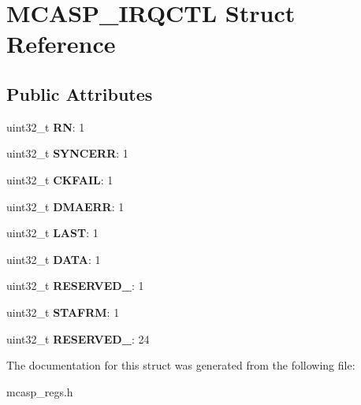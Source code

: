 \hypertarget{structMCASP__IRQCTL}{\section{M\-C\-A\-S\-P\-\_\-\-I\-R\-Q\-C\-T\-L Struct Reference}
\label{structMCASP__IRQCTL}
}
\subsection*{Public Attributes}
\begin{DoxyCompactItemize}
\item 
\hypertarget{structMCASP__IRQCTL_a10e401b985bcb51b7980fb804c258aef}{uint32\-\_\-t {\bfseries R\-N}\-: 1}\label{structMCASP__IRQCTL_a10e401b985bcb51b7980fb804c258aef}

\item 
\hypertarget{structMCASP__IRQCTL_ae45b300d6d7a61957281f887c145cb56}{uint32\-\_\-t {\bfseries S\-Y\-N\-C\-E\-R\-R}\-: 1}\label{structMCASP__IRQCTL_ae45b300d6d7a61957281f887c145cb56}

\item 
\hypertarget{structMCASP__IRQCTL_a6515fd9741cd453f30f6a9bd08db091d}{uint32\-\_\-t {\bfseries C\-K\-F\-A\-I\-L}\-: 1}\label{structMCASP__IRQCTL_a6515fd9741cd453f30f6a9bd08db091d}

\item 
\hypertarget{structMCASP__IRQCTL_a161a611ac65100c2869a4bbd2877c328}{uint32\-\_\-t {\bfseries D\-M\-A\-E\-R\-R}\-: 1}\label{structMCASP__IRQCTL_a161a611ac65100c2869a4bbd2877c328}

\item 
\hypertarget{structMCASP__IRQCTL_a582568ab51a883fa6079889032ca48b4}{uint32\-\_\-t {\bfseries L\-A\-S\-T}\-: 1}\label{structMCASP__IRQCTL_a582568ab51a883fa6079889032ca48b4}

\item 
\hypertarget{structMCASP__IRQCTL_a39aff8ec6dd1e46f20ab2ed47cdaf2e4}{uint32\-\_\-t {\bfseries D\-A\-T\-A}\-: 1}\label{structMCASP__IRQCTL_a39aff8ec6dd1e46f20ab2ed47cdaf2e4}

\item 
\hypertarget{structMCASP__IRQCTL_a722e62e4c5c82b3163f5109ac66d8eea}{uint32\-\_\-t {\bfseries R\-E\-S\-E\-R\-V\-E\-D\-\_}\-: 1}\label{structMCASP__IRQCTL_a722e62e4c5c82b3163f5109ac66d8eea}

\item 
\hypertarget{structMCASP__IRQCTL_ae90f6cdf1d1849030b974cbebbb3662d}{uint32\-\_\-t {\bfseries S\-T\-A\-F\-R\-M}\-: 1}\label{structMCASP__IRQCTL_ae90f6cdf1d1849030b974cbebbb3662d}

\item 
\hypertarget{structMCASP__IRQCTL_a8d62e2381e69092b3b652884a80fdede}{uint32\-\_\-t {\bfseries R\-E\-S\-E\-R\-V\-E\-D\-\_}\-: 24}\label{structMCASP__IRQCTL_a8d62e2381e69092b3b652884a80fdede}

\end{DoxyCompactItemize}


The documentation for this struct was generated from the following file\-:\begin{DoxyCompactItemize}
\item 
mcasp\-\_\-regs.\-h\end{DoxyCompactItemize}
